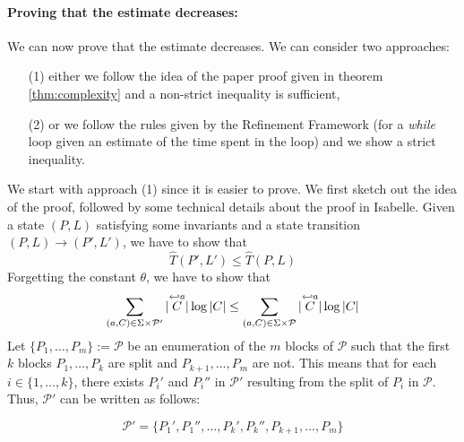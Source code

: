 \documentclass[12pt, a4 paper]{article}
\theoremstyle{definition}
\begin{document}
\paragraph{Proving that the estimate decreases:} We can now prove that the estimate decreases. We can consider two approaches:
\begin{itemize}
    \item[(1)] either we follow the idea of the paper proof given in theorem \ref{thm:complexity} and a non-strict inequality is sufficient,
    \item[(2)] or we follow the rules given by the Refinement Framework (for a \textit{while} loop given an estimate of the time spent in the loop) and we show a strict inequality.
\end{itemize}
We start with approach (1) since it is easier to prove. We first sketch out the idea of the proof, followed by some technical details about the proof in Isabelle. Given a state $(P, L)$ satisfying some invariants and a state transition $(P, L) \rightarrow (P', L')$, we have to show that
\begin{equation*}
    \hat{T}(P', L') \leq \hat{T}(P, L)
\end{equation*}
Forgetting the constant $\theta$, we have to show that
\begin{equation*}
    \sum_{(a, C) \in \Sigma\times \mathcal{P'}} | \overset{\hookleftarrow {a}}{C} | \log | C | \leq \sum_{(a, C) \in \Sigma\times \mathcal{P}} | \overset{\hookleftarrow {a}}{C} | \log | C |
\end{equation*}
Let $\{P_1, \dots, P_m\} := \mathcal{P}$ be an enumeration of the $m$ blocks of $\mathcal{P}$ such that the first $k$ blocks $P_1, \dots, P_k$ are split and $P_{k+1}, \dots, P_m$ are not.
This means that for each $i \in \{1, \dots, k\}$, there exists $P_i'$ and $P_i''$ in $\mathcal{P'}$ resulting from the split of $P_i$ in $\mathcal{P}$.
Thus, $\mathcal{P'}$ can be written as follows:

\begin{equation*}
    \mathcal{P'} = \{P_1', P_1'', \dots, P_k', P_k'', P_{k+1}, \dots, P_m\}
\end{equation*}
\end{document}
